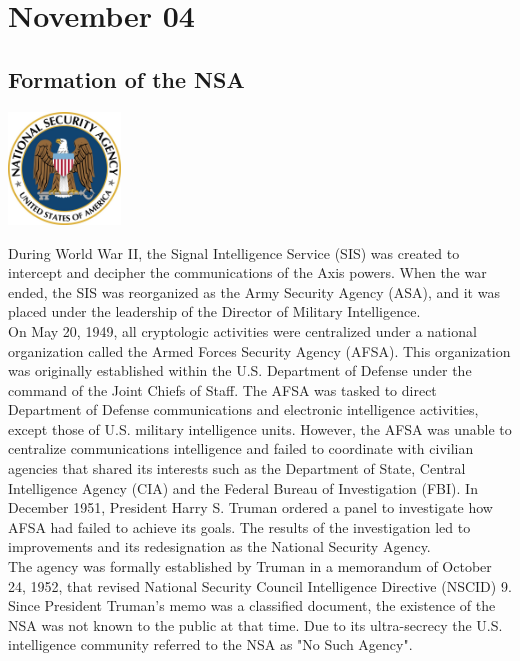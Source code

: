 \documentclass[11pt]{report}
\begin{document}
\section{November 04}
\subsection{Formation of the NSA}
\vspace{2mm}\begin{center}\includegraphics[width=3cm]{./img/NSALogo.jpg}\end{center}
During World War II, the Signal Intelligence Service (SIS) was created to intercept and decipher the communications of the Axis powers. When the war ended, the SIS was reorganized as the Army Security Agency (ASA), and it was placed under the leadership of the Director of Military Intelligence.\\
\indent On May 20, 1949, all cryptologic activities were centralized under a national organization called the Armed Forces Security Agency (AFSA). This organization was originally established within the U.S. Department of Defense under the command of the Joint Chiefs of Staff. The AFSA was tasked to direct Department of Defense communications and electronic intelligence activities, except those of U.S. military intelligence units. However, the AFSA was unable to centralize communications intelligence and failed to coordinate with civilian agencies that shared its interests such as the Department of State, Central Intelligence Agency (CIA) and the Federal Bureau of Investigation (FBI). In December 1951, President Harry S. Truman ordered a panel to investigate how AFSA had failed to achieve its goals. The results of the investigation led to improvements and its redesignation as the National Security Agency.\\
\indent The agency was formally established by Truman in a memorandum of October 24, 1952, that revised National Security Council Intelligence Directive (NSCID) 9. Since President Truman's memo was a classified document, the existence of the NSA was not known to the public at that time. Due to its ultra-secrecy the U.S. intelligence community referred to the NSA as "No Such Agency".
\end{document}
